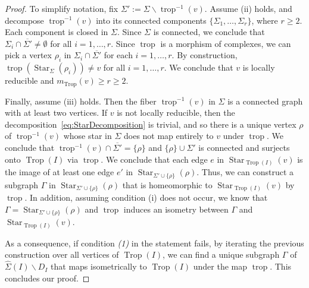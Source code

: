 \documentclass[11pt]{amsart}
\numberwithin{equation}{section}
\theoremstyle{plain}
\theoremstyle{definition}
\theoremstyle{remark}
\begin{document}
\begin{proof}
 To simplify notation, fix $\Sigma':= \Sigma\smallsetminus
 \operatorname{trop}^{-1}(v)$. Assume (ii) holds, and decompose $\operatorname{trop}^{-1}(v)$ into
 its connected components $\{\Sigma_1,\ldots, \Sigma_r\}$, where
 $r\geq 2$. Each component is closed in $\Sigma$. Since $\Sigma$ is
 connected, we conclude that $\Sigma_i \cap
 \overline{\Sigma'} 
 \neq \emptyset$ for all $i=1,\ldots, r$.  Since $\operatorname{trop}$ is a morphism
 of complexes, we can pick a vertex $\rho_i$ in $\Sigma_i \cap
 \overline{\Sigma'}$ for each $i=1,\ldots,r$. By construction,
 $\operatorname{trop}(\operatorname{\ensuremath{Star}}_{\Sigma}(\rho_i))\neq v$ for all $i=1,\ldots, r$.  We
 conclude that $v$ is locally reducible and $m_\operatorname{Trop}(v)\geq r\geq
 2$.

 Finally, assume (iii) holds. Then the fiber $\operatorname{trop}^{-1}(v)$ in
 $\Sigma$ is a connected graph with at least two vertices. If $v$ is
 not locally reducible, then the
 decomposition~\eqref{eq:StarDecomposition} is trivial, and so there
 is a unique vertex $\rho$ of $\operatorname{trop}^{-1}(v)$ whose star in $\Sigma$
 does not map entirely to $v$ under $\operatorname{trop}$. We conclude that $
 \operatorname{trop}^{-1}(v)\cap \overline{\Sigma'}=\{\rho\}$ and $\{\rho\} \cup
 \Sigma'$ is connected and surjects onto $\operatorname{Trop}(I)$ via $\operatorname{trop}$.  We
 conclude that each edge $e$ in $\operatorname{\ensuremath{Star}}_{\operatorname{Trop}(I)}(v)$ is the image of
 at least one edge $e'$ in $\operatorname{\ensuremath{Star}}_{\Sigma'\cup \{\rho\}}(\rho)$. Thus,
 we can construct a subgraph $\Gamma$ in $\operatorname{\ensuremath{Star}}_{\Sigma'\cup
   \{\rho\}}(\rho)$ that is homeomorphic to $\operatorname{\ensuremath{Star}}_{\operatorname{Trop}(I)}(v)$ by
 $\operatorname{trop}$.  In addition, assuming condition (i) does not occur, we know
 that $\Gamma=\operatorname{\ensuremath{Star}}_{\Sigma'\cup \{\rho\}}(\rho)$ and $\operatorname{trop}$ induces
 an isometry between $\Gamma$ and $\operatorname{\ensuremath{Star}}_{\operatorname{Trop}(I)}(v)$.

As a consequence, if condition \emph{(1)} in the statement fails, by
iterating the previous construction over all vertices of $\operatorname{Trop}(I)$,
we can find a unique subgraph $\Gamma$ of
$\widehat{\Sigma}(I)\smallsetminus D_I$ that maps isometrically to
$\operatorname{Trop}(I)$ under the map $\operatorname{trop}$.  This concludes our proof.
\end{proof}
\end{document}
